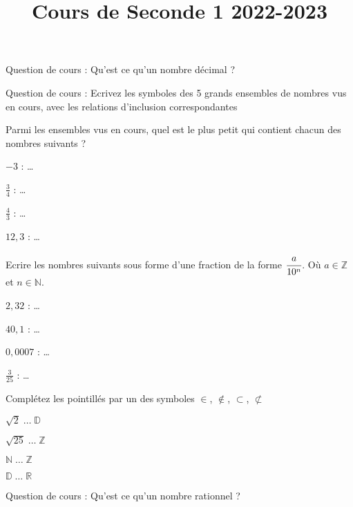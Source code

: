\documentclass[10pt,a4paper]{exam}
\title{Cours de Seconde 1 2022-2023}
\date{}
\newcommand{\N}{\mathbb{N}}
\newcommand{\Z}{\mathbb{Z}}
\begin{document}
Question de cours : Qu'est ce qu'un nombre décimal ?\newline
{}
 
Question de cours : Ecrivez les symboles des 5 grands ensembles de nombres vus en cours, avec les relations d'inclusion correspondantes\newline
{}

Parmi les ensembles vus en cours, quel est le plus petit qui contient chacun des nombres suivants ?
\begin{multicols}{4}
 \item $-3$ : \ldots
 \item $\frac{3}{4}$ :  \ldots
 \item $\frac{4}{3}$ : \ldots
 \item $12{,}3$ : \ldots
\end{multicols}
 
 
Ecrire les nombres suivants sous forme d'une fraction de la forme 
$\cfrac{a}{10^{n}}$. Où $a\in\Z$ et $n\in\N$.
\begin{multicols}{4}
 \item $2{,}32$ : \ldots
 \item $40{,}1$ : \ldots
 \item $0{,}0007$ : \ldots
 \item $\frac{3}{25}$ : \ldots
\end{multicols}
 


Complétez les pointillés par un des symboles $\in$, $\notin$, $\subset$, $\not\subset$
\begin{multicols}{4}
    \item $\sqrt{2}\;\ldots\;\mathbb{D}$
    \item $\sqrt{25}\;\ldots\;\mathbb{Z}$
    \item $\mathbb{N}\;\ldots\;\mathbb{Z}$
    \item $\mathbb{D}\;\ldots\;\mathbb{R}$
\end{multicols}
 
 
 
\vspace{23mm}


Question de cours : Qu'est ce qu'un nombre rationnel ?\newline
{}
\end{document}
